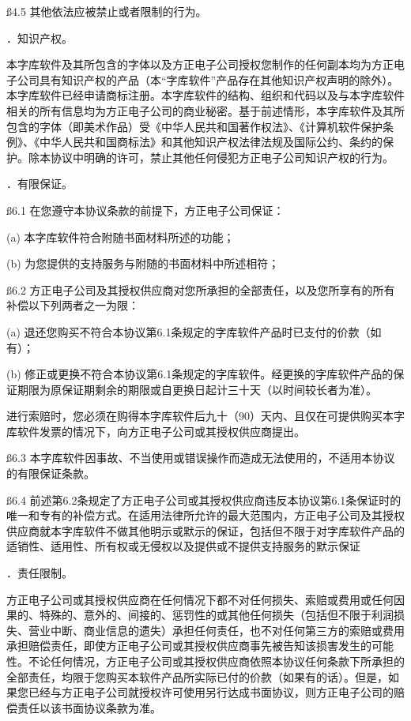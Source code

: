 \ss 4.5 其他依法应被禁止或者限制的行为。\par
{}．知识产权。\par
\ssss 本字库软件及其所包含的字体以及方正电子公司授权您制作的任何副本均为方正电子公司具有知识产权的产品（本“字库软件”产品存在其他知识产权声明的除外）。本字库软件已经申请商标注册。本字库软件的结构、组织和代码以及与本字库软件相关的所有信息均为方正电子公司的商业秘密。基于前述情形，本字库软件及其所包含的字体（即美术作品）受《中华人民共和国著作权法》、《计算机软件保护条例》、《中华人民共和国商标法》和其他知识产权法律法规及国际公约、条约的保护。除本协议中明确的许可，禁止其他任何侵犯方正电子公司知识产权的行为。\par
{}．有限保证。\par
\ss 6.1 在您遵守本协议条款的前提下，方正电子公司保证：\par
\ssss (a) 本字库软件符合附随书面材料所述的功能；\par
\ssss (b) 为您提供的支持服务与附随的书面材料中所述相符；\par
\ss 6.2 方正电子公司及其授权供应商对您所承担的全部责任，以及您所享有的所有补偿以下列两者之一为限：\par
\ssss (a) 退还您购买不符合本协议第6.1条规定的字库软件产品时已支付的价款（如有）；\par
\ssss (b) 修正或更换不符合本协议第6.1条规定的字库软件。经更换的字库软件产品的保证期限为原保证期剩余的期限或自更换日起计三十天（以时间较长者为准）。\par
\ssss 进行索赔时，您必须在购得本字库软件后九十（90）天内、且仅在可提供购买本字库软件发票的情况下，向方正电子公司或其授权供应商提出。\par
\ss 6.3 本字库软件因事故、不当使用或错误操作而造成无法使用的，不适用本协议的有限保证条款。\par
\ss 6.4 前述第6.2条规定了方正电子公司或其授权供应商违反本协议第6.1条保证时的唯一和专有的补偿方式。在适用法律所允许的最大范围内，方正电子公司及其授权供应商就本字库软件不做其他明示或默示的保证，包括但不限于对字库软件产品的适销性、适用性、所有权或无侵权以及提供或不提供支持服务的默示保证\par
{}．责任限制。\par
\ssss 方正电子公司或其授权供应商在任何情况下都不对任何损失、索赔或费用或任何因果的、特殊的、意外的、间接的、惩罚性的或其他任何损失（包括但不限于利润损失、营业中断、商业信息的遗失）承担任何责任，也不对任何第三方的索赔或费用承担赔偿责任，即使方正电子公司或其授权供应商事先被告知该损害发生的可能性。不论任何情况，方正电子公司或其授权供应商依照本协议任何条款下所承担的全部责任，均限于您购买本软件产品所实际已付的价款（如果有的话）。但是，如果您已经与方正电子公司就授权许可使用另行达成书面协议，则方正电子公司的赔偿责任以该书面协议条款为准。\par
